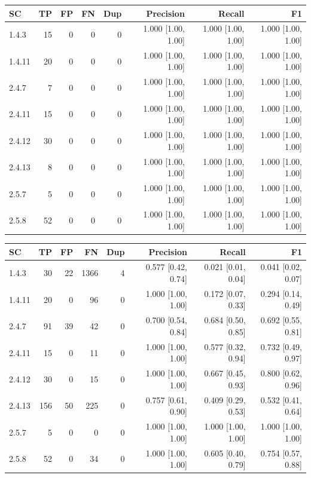 \begin{tabular}{lrrrrrrr}
\hline
SC & TP & FP & FN & Dup & Precision & Recall & F1 \\
\hline
1.4.3 & 15 & 0 & 0 & 0 & 1.000 [1.00, 1.00] & 1.000 [1.00, 1.00] & 1.000 [1.00, 1.00] \\
1.4.11 & 20 & 0 & 0 & 0 & 1.000 [1.00, 1.00] & 1.000 [1.00, 1.00] & 1.000 [1.00, 1.00] \\
2.4.7 & 7 & 0 & 0 & 0 & 1.000 [1.00, 1.00] & 1.000 [1.00, 1.00] & 1.000 [1.00, 1.00] \\
2.4.11 & 15 & 0 & 0 & 0 & 1.000 [1.00, 1.00] & 1.000 [1.00, 1.00] & 1.000 [1.00, 1.00] \\
2.4.12 & 30 & 0 & 0 & 0 & 1.000 [1.00, 1.00] & 1.000 [1.00, 1.00] & 1.000 [1.00, 1.00] \\
2.4.13 & 8 & 0 & 0 & 0 & 1.000 [1.00, 1.00] & 1.000 [1.00, 1.00] & 1.000 [1.00, 1.00] \\
2.5.7 & 5 & 0 & 0 & 0 & 1.000 [1.00, 1.00] & 1.000 [1.00, 1.00] & 1.000 [1.00, 1.00] \\
2.5.8 & 52 & 0 & 0 & 0 & 1.000 [1.00, 1.00] & 1.000 [1.00, 1.00] & 1.000 [1.00, 1.00] \\
\hline
\end{tabular}

\begin{tabular}{lrrrrrrr}
\hline
SC & TP & FP & FN & Dup & Precision & Recall & F1 \\
\hline
1.4.3 & 30 & 22 & 1366 & 4 & 0.577 [0.42, 0.74] & 0.021 [0.01, 0.04] & 0.041 [0.02, 0.07] \\
1.4.11 & 20 & 0 & 96 & 0 & 1.000 [1.00, 1.00] & 0.172 [0.07, 0.33] & 0.294 [0.14, 0.49] \\
2.4.7 & 91 & 39 & 42 & 0 & 0.700 [0.54, 0.84] & 0.684 [0.50, 0.85] & 0.692 [0.55, 0.81] \\
2.4.11 & 15 & 0 & 11 & 0 & 1.000 [1.00, 1.00] & 0.577 [0.32, 0.94] & 0.732 [0.49, 0.97] \\
2.4.12 & 30 & 0 & 15 & 0 & 1.000 [1.00, 1.00] & 0.667 [0.45, 0.93] & 0.800 [0.62, 0.96] \\
2.4.13 & 156 & 50 & 225 & 0 & 0.757 [0.61, 0.90] & 0.409 [0.29, 0.53] & 0.532 [0.41, 0.64] \\
2.5.7 & 5 & 0 & 0 & 0 & 1.000 [1.00, 1.00] & 1.000 [1.00, 1.00] & 1.000 [1.00, 1.00] \\
2.5.8 & 52 & 0 & 34 & 0 & 1.000 [1.00, 1.00] & 0.605 [0.40, 0.79] & 0.754 [0.57, 0.88] \\
\hline
\end{tabular}

